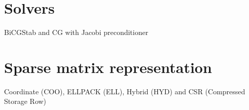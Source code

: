 \section{Solvers}
BiCGStab and CG with Jacobi preconditioner

\section{Sparse matrix representation}
Coordinate (COO), ELLPACK (ELL), Hybrid
(HYD) and CSR (Compressed Storage Row)